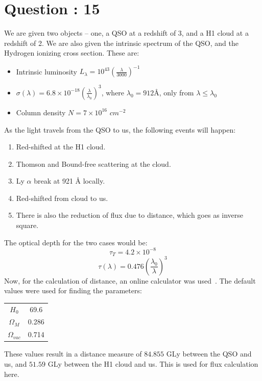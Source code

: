 \documentclass{article}
\begin{document}
\section{Question : 15}
We are given two objects -- one, a QSO at a redshift of 3, and a H1 cloud at a redshift of 2. We are also given the intrinsic spectrum of the QSO, and the Hydrogen ionizing cross section. These are:
\begin{itemize}
\item Intrinsic luminosity $L_\lambda =  10^{43}\left(\frac{\lambda}{3000}\right)^{-1}$
\item $\sigma(\lambda) = 6.8\times 10^{-18}\left(\frac{\lambda}{\lambda_0}\right)^3$, where $\lambda_0 = 912$\AA, only from $\lambda \leq \lambda_0$
\item Column density $N = 7\times10^{16}$ $cm^{-2}$
\end{itemize}
As the light travels from the QSO to us, the following events will happen:
\begin{enumerate}
\item Red-shifted at the H1 cloud.
\item Thomson and Bound-free scattering at the cloud.
\item Ly $\alpha$ break at 921 {\AA} locally.
\item Red-shifted from cloud to us.
\item There is also the reduction of flux due to distance, which goes as inverse square. 
\end{enumerate}
The optical depth for the two cases would be:
$$ \tau_T = 4.2\times 10^{-8}$$
$$ \tau(\lambda) = 0.476 \left(\frac{\lambda_0}{\lambda}\right)^3$$
Now, for the calculation of distance, an online calculator was used~\cite{Calc}. The default values were used for finding the parameters:
\begin{center}
\begin{tabular}{c|c}
\hline 
$H_0$ & 69.6 \\
$\Omega_M$ & 0.286 \\
$\Omega_{vac}$ & 0.714 \\
\hline
\end{tabular}
\end{center}
These values result in a distance measure of $84.855$ GLy between the QSO and us, and $51.59$ GLy between the H1 cloud and us. This is used for flux calculation here. 
\end{document}
